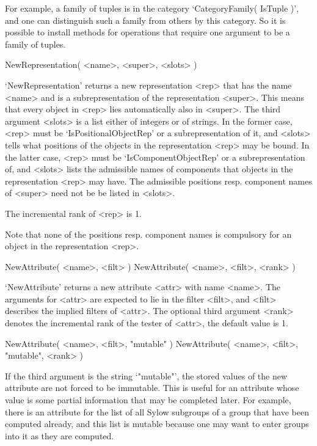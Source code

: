 For example, a family of tuples is in the category
`CategoryFamily( IsTuple )',
and one can distinguish such a family from others by this category.
So it is possible to install methods for operations that require one
argument to be a family of tuples.



\>NewRepresentation( <name>, <super>, <slots> )

`NewRepresentation' returns a new representation <rep> that has the name
<name> and is a subrepresentation of the representation <super>.
This means that every object in <rep> lies automatically also in <super>.
The third argument <slots> is a list either of integers or of strings.
In the former case, <rep> must be `IsPositionalObjectRep' or a
subrepresentation of it, and <slots> tells what positions of the objects
in the representation <rep> may be bound.
In the latter case, <rep> must be `IsComponentObjectRep' or a
subrepresentation of, and <slots> lists the admissible names of
components that objects in the representation <rep> may have.
The admissible positions resp. component names of <super> need not be
be listed in <slots>.

The incremental rank of <rep> is 1.

Note that none of the positions resp. component names is compulsory for
an object in the representation <rep>.



\>NewAttribute( <name>, <filt> )
\>NewAttribute( <name>, <filt>, <rank> )

`NewAttribute' returns a new attribute <attr> with name <name>.
The arguments for <attr> are expected to lie in the filter <filt>,
and <filt> describes the implied filters of <attr>.
The optional third argument <rank> denotes the incremental rank of
the tester of <attr>, the default value is 1.

\>NewAttribute( <name>, <filt>, "mutable" )
\>NewAttribute( <name>, <filt>, "mutable", <rank> )

If the third argument is the string `"mutable"', the stored values of the
new attribute are not forced to be immutable.
This is useful for an attribute whose value is some partial information
that may be completed later.
For example, there is an attribute for the list of all Sylow subgroups
of a group that have been computed already,
and this list is mutable because one may want to enter groups into it
as they are computed.

